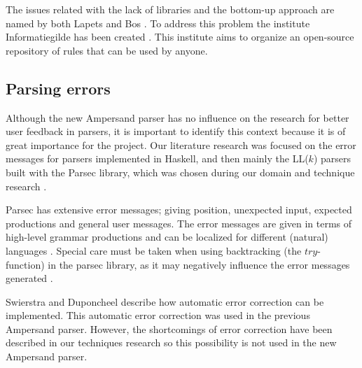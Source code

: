 The issues related with the lack of libraries and the bottom-up approach are named by both Lapets  and Bos .
To address this problem the institute Informatiegilde has been created .
This institute aims to organize an open-source repository of rules that can be used by anyone.

\subsection{Parsing errors}
Although the new Ampersand parser has no influence on the research for better user feedback in parsers, it is important to identify this context because it is of great importance for the project.
Our literature research was focused on the error messages for parsers implemented in Haskell, and then mainly the LL($k$) parsers built with the Parsec library, which was chosen during our domain and technique research .

Parsec has extensive error messages; giving position, unexpected input, expected productions and general user messages.
The error messages are given in terms of high-level grammar productions and can be localized for different (natural) languages .
Special care must be taken when using backtracking (the $try$-function) in the parsec library, as it may negatively influence the error messages generated .

Swierstra and Duponcheel  describe how automatic error correction can be implemented.
This automatic error correction was used in the previous Ampersand parser.
However, the shortcomings of error correction have been described in our techniques research \cite{parsing} so this possibility is not used in the new Ampersand parser.












